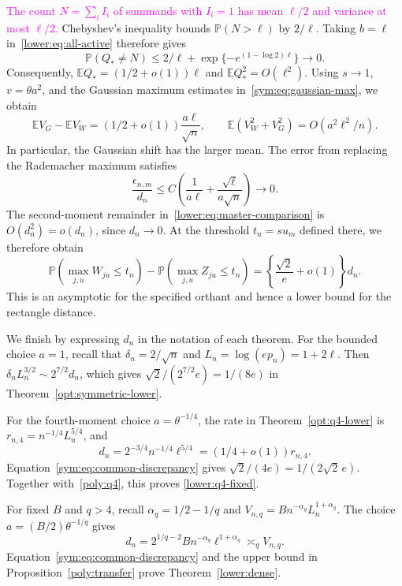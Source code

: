\documentclass[11pt,letterpaper]{article}
\newenvironment{recovered}{\color{magenta}}{}
\theoremstyle{remark}
\newcommand{\E}{\mathbb E}
\newcommand{\Pp}{\mathbb P}
\begin{document}
\textcolor{magenta}{The count \(N=\sum_iI_i\) of summands with \(I_i=1\) has mean \(\ell/2\) and variance at most \(\ell/2\).}
\begin{recovered}
Chebyshev's inequality bounds \(\Pp(N>\ell)\) by \(2/\ell\).
Taking \(b=\ell\) in~\eqref{lower:eq:all-active} therefore gives
\end{recovered}
\[
 \Pp(Q_*\ne N)\le 2/\ell+
       \exp\{-e^{(1-\log2)\ell}\}\longrightarrow0.
\]
Consequently, \(\E Q_*=(1/2+o(1))\ell\) and
\(\E Q_*^2=O(\ell^2)\).
\begin{recovered}
Using \(s\to1\), \(v=\theta a^2\), and the Gaussian maximum
estimates in~\eqref{sym:eq:gaussian-max}, we obtain
\end{recovered}
\[
 \E V_G-\E V_W=(1/2+o(1))\frac{a\ell}{\sqrt n},
 \qquad
 \E(V_W^2+V_G^2)=O(a^2\ell^2/n).
\]
In particular, the Gaussian shift has the larger mean.
The error from replacing the Rademacher maximum satisfies
\[
 \frac{\epsilon_{n,m}}{d_n}
 \le C\left(\frac1{a\ell}+\frac{\sqrt\ell}{a\sqrt n}\right)\to0.
\]
\begin{recovered}
The second-moment remainder in~\eqref{lower:eq:master-comparison}
is \(O(d_n^2)=o(d_n)\), since \(d_n\to0\).
At the threshold \(t_n=su_m\) defined there, we therefore obtain
\end{recovered}
\begin{equation}
 \Pp(\max_{j,u}W_{ju}\le t_n)-\Pp(\max_{j,u}Z_{ju}\le t_n)
 =\left\{\frac{\sqrt2}{e}+o(1)\right\}d_n.
 \label{sym:eq:common-discrepancy}
\end{equation}
This is an asymptotic for the specified orthant and hence a lower
bound for the rectangle distance.

We finish by expressing \(d_n\) in the notation of each theorem.
For the bounded choice \(a=1\), recall that
\(\delta_n=2/\sqrt n\) and \(L_n=\log(ep_n)=1+2\ell\).
Then \(\delta_nL_n^{3/2}\sim2^{7/2}d_n\), which gives
\(\sqrt2/(2^{7/2}e)=1/(8e)\) in
Theorem~\ref{opt:symmetric-lower}.

For the fourth-moment choice \(a=\theta^{-1/4}\), the rate in
Theorem~\ref{opt:q4-lower} is \(r_{n,4}=n^{-1/4}L_n^{5/4}\), and
\[
 d_n=2^{-3/4}n^{-1/4}\ell^{5/4}
       =(1/4+o(1))r_{n,4}.
\]
Equation~\eqref{sym:eq:common-discrepancy} gives
\(\sqrt2/(4e)=1/(2\sqrt2\,e)\).
Together with~\eqref{poly:q4}, this proves
\eqref{lower:q4-fixed}.

For fixed \(B\) and \(q>4\), recall
\(\alpha_q=1/2-1/q\) and
\(V_{n,q}=Bn^{-\alpha_q}L_n^{1+\alpha_q}\).
The choice \(a=(B/2)\theta^{-1/q}\) gives
\[
 d_n=2^{1/q-2}Bn^{-\alpha_q}\ell^{1+\alpha_q}
       \asymp_q V_{n,q}.
\]
Equation~\eqref{sym:eq:common-discrepancy} and the upper bound in
Proposition~\ref{poly:transfer} prove Theorem~\ref{lower:dense}.
\end{document}
